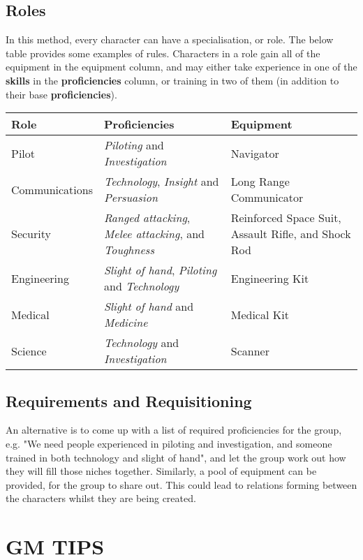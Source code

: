\documentclass[11pt]{article}
\begin{document}
\begin{multicols}{3}
  \subsection*{Roles}

  In this method, every character can have a specialisation, or role. The below table provides some examples of rules. Characters in a role gain all of the equipment in the equipment column, and may either take experience in one of the \textbf{skills} in the \textbf{proficiencies} column, or training in two of them (in addition to their base \textbf{proficiencies}).

  \begin{tabularx}{\linewidth}{lXX}
    Role & Proficiencies & Equipment \\
    \hline
    Pilot & \textit{Piloting} and \textit{Investigation} & Navigator \\
    Communications & \textit{Technology}, \textit{Insight} and \textit{Persuasion} & Long Range Communicator \\
    Security & \textit{Ranged attacking}, \textit{Melee attacking}, and \textit{Toughness} & Reinforced Space Suit, Assault Rifle, and Shock Rod \\
    Engineering & \textit{Slight of hand}, \textit{Piloting} and \textit{Technology} & Engineering Kit \\
    Medical & \textit{Slight of hand} and \textit{Medicine} & Medical Kit \\
    Science & \textit{Technology} and \textit{Investigation} & Scanner
  \end{tabularx}

  \subsection*{Requirements and Requisitioning}

  An alternative is to come up with a list of required proficiencies for the group, e.g. "We need people experienced in piloting and investigation, and someone trained in both technology and slight of hand", and let the group work out how they will fill those niches together. Similarly, a pool of equipment can be provided, for the group to share out. This could lead to relations forming between the characters whilst they are being created.

  \section{GM TIPS}


\end{multicols}
\end{document}
